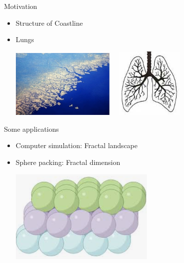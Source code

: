 \documentclass[]{beamer}
\begin{document}
\begin{frame}{Motivation}
\begin{itemize}
    \item Structure of Coastline
    \item Lungs
    
    \centering
    \includegraphics[width = 5cm]{Pictures/coastline.jpg}
    \includegraphics[height = 3.4cm, width  = 4cm]{Pictures/lungs.jpg}
\end{itemize}
\end{frame}

\begin{frame}{Some applications}
    \begin{itemize}
        \item Computer simulation: Fractal landscape
        \item Sphere packing: Fractal dimension

        \centering
        \includegraphics[width=7cm]{Pictures/spherepacking.png}
    \end{itemize}
\end{frame}
\end{document}
